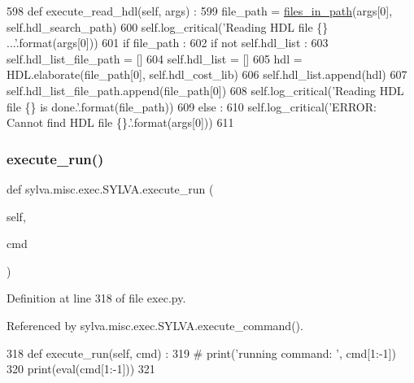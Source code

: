 \begin{DoxyCode}
598   \textcolor{keyword}{def }execute\_read\_hdl(self, args) :
599     file\_path = \hyperlink{namespacesylva_1_1misc_1_1util_a7ad460a52be16d3083cb41f0be004714}{files\_in\_path}(args[0], self.hdl\_search\_path)
600     self.log\_critical(\textcolor{stringliteral}{'Reading HDL file \{\} ...'}.format(args[0]))
601     \textcolor{keywordflow}{if} file\_path :
602       \textcolor{keywordflow}{if} \textcolor{keywordflow}{not} self.hdl\_list :
603         self.hdl\_list\_file\_path = []
604         self.hdl\_list = []
605       hdl = HDL.elaborate(file\_path[0], self.hdl\_cost\_lib)
606       self.hdl\_list.append(hdl)
607       self.hdl\_list\_file\_path.append(file\_path[0])
608       self.log\_critical(\textcolor{stringliteral}{'Reading HDL file \{\} is done.'}.format(file\_path))
609     \textcolor{keywordflow}{else} :
610       self.log\_critical(\textcolor{stringliteral}{'ERROR: Cannot find HDL file \{\}.'}.format(args[0]))
611 
\end{DoxyCode}
\mbox{\label{classsylva_1_1misc_1_1exec_1_1_s_y_l_v_a_ab4675d585d77d48f755842f22f9f845a}} 
\subsubsection{\texorpdfstring{execute\+\_\+run()}{execute\_run()}}
{\footnotesize\ttfamily def sylva.\+misc.\+exec.\+S\+Y\+L\+V\+A.\+execute\+\_\+run (\begin{DoxyParamCaption}\item[{}]{self,  }\item[{}]{cmd }\end{DoxyParamCaption})}



Definition at line 318 of file exec.\+py.



Referenced by sylva.\+misc.\+exec.\+S\+Y\+L\+V\+A.\+execute\+\_\+command().


\begin{DoxyCode}
318   \textcolor{keyword}{def }execute\_run(self, cmd) :
319     \textcolor{comment}{# print('running command: ', cmd[1:-1])}
320     print(eval(cmd[1:-1]))
321 
\end{DoxyCode}
\mbox{\label{classsylva_1_1misc_1_1exec_1_1_s_y_l_v_a_a341672492c585c71c0a030e9de2d399a}} 
